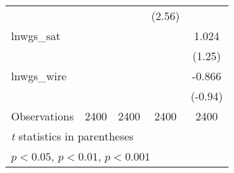 \documentclass[a4paper, 12pt]{article}
\theoremstyle{definition}
\begin{document}
\begin{table}[htbp]
\begin{tabular}{l*{4}{c}}
		&                     &                     &      (2.56)         &                     \\
		[1em]
		lnwgs\_sat           &                     &                     &                     &       1.024         \\
		&                     &                     &                     &      (1.25)         \\
		[1em]
		lnwgs\_wire          &                     &                     &                     &      -0.866         \\
		&                     &                     &                     &     (-0.94)         \\
		\hline
		Observations        &        2400         &        2400         &        2400         &        2400         \\
		\hline\hline
		\multicolumn{5}{l}{\footnotesize \textit{t} statistics in parentheses}\\
		\multicolumn{5}{l}{\footnotesize \sym{*} \(p<0.05\), \sym{**} \(p<0.01\), \sym{***} \(p<0.001\)}\\
	\end{tabular}
\end{table}
\end{document}
